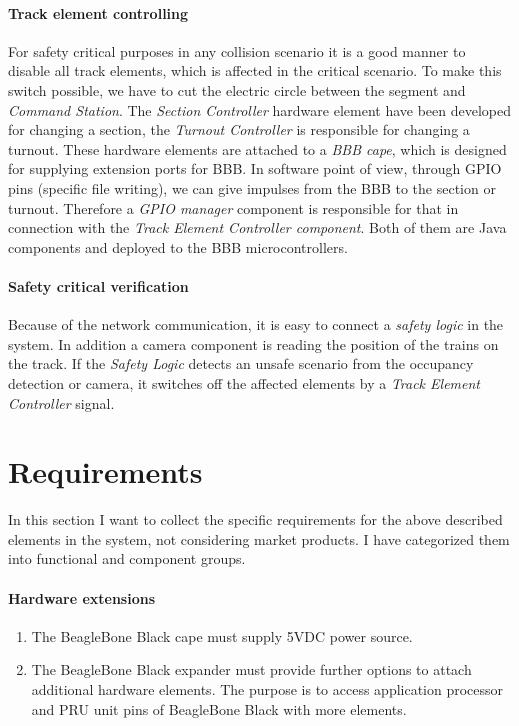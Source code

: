 \paragraph{Track element controlling}\label{par:FunctionTEC}
For safety critical purposes in any collision scenario it is a good manner to disable all track elements, which is affected in the critical scenario. To make this switch possible, we have to cut the electric circle between the segment and \textit{Command Station}. The \textit{Section Controller} hardware element have been developed for changing a section,  the \textit{Turnout Controller} is responsible for changing a turnout. These hardware elements are attached to a \textit{BBB cape}, which is designed for supplying extension ports for BBB. In software point of view, through GPIO pins (specific file writing), we can give impulses from the BBB to the section or turnout. Therefore a \textit{GPIO manager} component is responsible for that in connection with the \textit{Track Element Controller component}. Both of them are Java components and deployed to the BBB microcontrollers.

\paragraph{Safety critical verification}
Because of the network communication, it is easy to connect a \textit{safety logic} in the system. In addition a camera component is reading the position of the trains on the track. If the \textit{Safety Logic} detects an unsafe scenario from the occupancy detection or camera, it switches off the affected elements by a \textit{Track Element Controller} signal.

\section{Requirements}\label{section:REQ}
In this section I want to collect the specific requirements for the above described elements in the system, not considering market products. I have categorized them into functional and component groups.


\paragraph{Hardware extensions}
\begin{enumerate}[label=REQ-BBB-\arabic*, leftmargin=*, format=\small]
	\item The BeagleBone Black cape must supply 5VDC power source.
	\item The BeagleBone Black expander must provide further options to attach additional hardware elements. The purpose is to access application processor and PRU unit pins of BeagleBone Black with more elements.
\end{enumerate}


